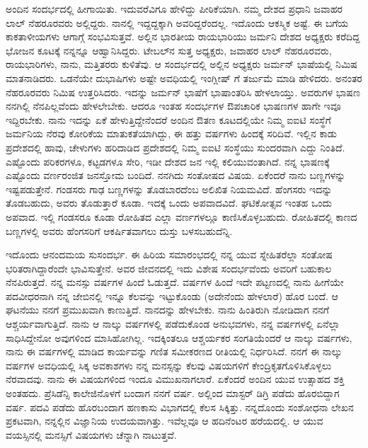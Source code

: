 \vskip 2pt

ಅಂದಿನ ಸಂದರ್ಭದಲ್ಲಿ ಹೀಗಾಯಿತು. ಇದುವರೆವಿಗೂ ಹೇಳಿದ್ದು ಪೀಠಿಕೆಯಾಗಿ. ನಮ್ಮ ದೇಶದ ಪ್ರಧಾನಿ ಜವಾಹರ ಲಾಲ್ ನೆಹರೂರವರು ಅಲ್ಲಿದ್ದರು. ನಾನಲ್ಲಿ ಇದ್ದದ್ದಕ್ಕಾಗಿ ಅವರಿದ್ದರೆಂದಲ್ಲ. ಇದೊಂದು ಆಕಸ್ಮಿಕ ಅಷ್ಟೆ. ಈ ಬಗೆಯ ಕಾಕತಾಳೀಯಗಳು ಆಗಾಗ್ಗೆ ಸಂಭವಿಸುತ್ತವೆ. ಅಲ್ಲಿನ ಭಾರತೀಯ ರಾಯಭಾರಿಯು ಜರ್ಮನಿ ದೇಶದ ಅಧ್ಯಕ್ಷರು ಕರೆದಿದ್ದ ಭೋಜನ ಕೂಟಕ್ಕೆ ನನ್ನನ್ನೂ ಆಹ್ವಾನಿಸಿದ್ದರು. ಟೇಬಲ್‍ನ ಸುತ್ತ ಅಧ್ಯಕ್ಷರು, ಜವಾಹರ ಲಾಲ್ ನೆಹರೂರವರು, ರಾಯಭಾರಿಗಳು, ನಾನು, ಮತ್ತಿತರರು ಕುಳಿತೆವು. ಆ ಸಂದರ್ಭದಲ್ಲಿ ಅಲ್ಲಿನ ಅಧ್ಯಕ್ಷರು ಜರ್ಮನ್ ಭಾಷೆಯಲ್ಲಿ  ನಿಮಿಷ ಮಾತನಾಡಿದರು. ಒಡನೆಯೇ ದುಭಾಷಿಗಳು ಅಷ್ಟೇ ಅವಧಿಯಲ್ಲಿ ಇಂಗ್ಲೀಷ್ ಗೆ ತರ್ಜುಮೆ ಮಾಡಿ ಹೇಳಿದರು. ಅನಂತರ ನೆಹರೂರವರು  ನಿಮಿಷ ಉತ್ತರಿಸಿದರು. ಇದನ್ನು ಜರ್ಮನ್ ಭಾಷೆಗೆ ಭಾಷಾಂತರಿಸಿ ಹೇಳಲಾಯ್ತು. ಅವರುಗಳ ಭಾಷಣ ನನಗಿಲ್ಲಿ ನೆನಪಿಲ್ಲವೆಂದು ಹೇಳಲೇಬೇಕು. ಆದರೂ ಇಂತಹ ಸಂದರ್ಭಗಳ ಔಪಚಾರಿಕ ಭಾಷಣಗಳ ಹಾಗೇ ಇವೂ ಇದ್ದಿರಬೇಕು. ನಾನು ಇದನ್ನು ಏಕೆ ಹೇಳುತ್ತಿದ್ದೇನೆಂದರೆ ಅಂದಿನ ಔತಣ ಕೂಟದಲ್ಲಿಯೇ ನಿಮ್ಮ ಐಐಟಿ ಸಂಸ್ಥೆಗೆ ಜರ್ಮನಿಯ ನೆರವು ಕೋರಿಕೆಯ ಮಾತುಕತೆಯಾಗಿದ್ದು, ಈ ಹತ್ತು ವರ್ಷಗಳು ಹಿಂದಕ್ಕೆ ಸರಿದಿವೆ. ಇಲ್ಲಿನ ಕಾಡು ಪ್ರದೇಶದಲ್ಲಿ ಹಾವು, ಚೇಳುಗಳು ಹರಿದಾಡಿದ ಪ್ರದೇಶದಲ್ಲಿ ನಿಮ್ಮ ಐಐಟಿ ಸಂಸ್ಥೆಯು ಸುಂದರವಾಗಿ ಎದ್ದು ನಿಂತಿದೆ. ಎಷ್ಟೊಂದು ಪರಿಕರಗಳೂ, ಕಟ್ಟಡಗಳೂ ಸೇರಿ, ಇಡೀ ದೇಶದ ಜನ ಇಲ್ಲಿ ಕಲಿಯುವಂತಾಗಿದೆ. ನನ್ನ ಭಾಷಣಕ್ಕೆ ಎಷ್ಟೊಂದು ವರ್ಣರಂಜಿತ ಜನಸ್ತೋಮ ಬಂದಿದೆ. ನನಗಿದು ಸಂತೋಷದ ವಿಷಯ. ಏಕೆಂದರೆ ನಾನು ಬಣ್ಣಗಳನ್ನು ಇಷ್ಟಪಡುತ್ತೇನೆ. ಗಂಡಸರು ಗಾಢ ಬಣ್ಣಗಳನ್ನು ತೊಡಬಾರದೆಂಬ ಅಲಿಖಿತ ನಿಯಮವಿದೆ. ಹೆಂಗಸರು ಇದನ್ನು ತೊಡಬಹುದು, ಅವರು ತೊಡುತ್ತಾರೆ ಕೂಡಾ. ಇದಕ್ಕೆ ಒಂದು ಅಪವಾದವಿದೆ. ಘಟಿಕೋತ್ಸವ ಇಂತಹ ಒಂದು ಅಪವಾದ. ಇಲ್ಲಿ ಗಂಡಸರೂ ಕೂಡಾ ರೋಹಿತದ ಎಲ್ಲಾ ವರ್ಣಗಳಲ್ಲೂ ಕಾಣಿಸಿಕೊಳ್ಳಬಹುದು. ರೋಹಿತದಲ್ಲಿ ಕಾಣದ ಬಣ್ಣಗಳಲ್ಲಿ ಅವರು ಹೆಂಗಸರಿಗೆ ಆಕರ್ಷಿತವಾಗಲು ದುಸ್ತು ಬಳಸಬಹುದೆನ್ನಿ.



ಇದೊಂದು ಆನಂದಮಯ ಸುಸಂದರ್ಭ. ಈ ಹಿರಿಯ ಸಮಾರಂಭದಲ್ಲಿ ನನ್ನ ಯುವ ಸ್ನೇಹಿತರೆಲ್ಲಾ ಸಂತೋಷ ಭರಿತರಾಗಿದ್ದಾರೆಂದೇ ಭಾವಿಸುತ್ತೇನೆ. ಅವರ ಜೀವನದಲ್ಲಿ ಇದು ವಿಶೇಷ ಸಂದರ್ಭವೆಂದು ಅವರಿಗೆ ಬಹುಕಾಲ ನೆನಪಿರುತ್ತದೆ. ನನ್ನ ಮನಸ್ಸು  ವರ್ಷಗಳ ಹಿಂದೆ ಓಡುತ್ತದೆ.  ವರ್ಷಗಳ ಹಿಂದೆ ಇದೇ ಪಟ್ಟಣದಲ್ಲಿ ನಾನು ಹೀಗೆಯೇ ಪದವೀಧರನಾಗಿ ನನ್ನ ಜೇಬಿನಲ್ಲಿ ಇನ್ನೂ ಕೆಲವನ್ನು ಇಟ್ಟುಕೊಂಡು (ಅದೇನೆಂದು ಹೇಳಲಾರೆ) ಹೊರ ಬಂದೆ. ಆ ಘಟನೆಯು ನನಗೆ ಪ್ರಮುಖವಾಗಿ ಕಾಣುತ್ತಿದೆ. ನಾನದನ್ನು ಹೇಳಬೇಕು. ನಾನು ಹಿಂತಿರುಗಿ ನೋಡಿದಾಗ ನನಗೆ ಆಶ್ಚರ್ಯವಾಗುತ್ತಿದೆ. ನಾನು ಆ ನಾಲ್ಕು ವರ್ಷಗಳಲ್ಲಿ ಪಡೆದುಕೊಂಡ ಅನುಭವಗಳು, ನನ್ನ  ವರ್ಷಗಳಲ್ಲಿ ಏನೆಲ್ಲಾ ಸಾಧಿಸಿದ್ದೇನೋ ಅವುಗಳಿಂದ ಮಾಸಿಹೋಗಿಲ್ಲ. ಇದಕ್ಕಿಂತಲೂ ಆಶ್ಚರ್ಯಕರ ಸಂಗತಿಯೆಂದರೆ ಆ ನಾಲ್ಕು ವರ್ಷಗಳು, ನಾನು ಈ  ವರ್ಷಗಳಲ್ಲಿ ಮಾಡಿದ ಕಾರ್ಯವನ್ನು ಗಣಿತ ಸಮೀಕರಣದ ರೀತಿಯಲ್ಲಿ ನಿರ್ಧರಿಸಿದೆ. ನನಗೆ ಈ ನಾಲ್ಕು ವರ್ಷಗಳ ಅವಧಿಯಲ್ಲಿ ಸಿಕ್ಕ ಅವಕಾಶಗಳು ನನ್ನ ಮನಸ್ಸನ್ನು ಕೆಲವು ವಿಷಯಗಳಿಗೆ ಕೇಂದ್ರಿಕೃತಗೊಳಿಸಿಕೊಳ್ಳಲು ನೆರವಾದವು. ನಾನು ಈ ವಿಷಯಗಳಿಂದ ಇಂದೂ ವಿಮುಖನಾಗಲಾರೆ. ಏಕೆಂದರೆ ಅಂದಿನ ಯುವ ಉತ್ಸಾಹದ ಶಕ್ತಿ ಅಂತಹದು. ಪ್ರೆಸಿಡೆನ್ಸಿ ಕಾಲೇಜಿನೊಳಗೆ ಬಂದಾಗ ನನಗೆ  ವರ್ಷ. ಅಲ್ಲಿಂದ ಮಾಸ್ಟರ್ ಡಿಗ್ರಿ ಪಡೆದು ಹೊರಬಿದ್ದಾಗ  ವರ್ಷ. ಪದವಿ ಪಡೆದು ಹೊರಬಂದಾಗ ಹಣಕಾಸು ವಿಭಾಗದಲ್ಲಿ ಕೆಲಸ ಸಿಕ್ಕಿತ್ತು. ನನ್ನದೊಂದು ಸಂಶೋಧನಾ ಲೇಖನ ಪ್ರಕಟವಾಗಿ, ನನ್ನಲ್ಲಿನ ವಿಜ್ಞಾನಿಯ ಉದಯವಾಗಿತ್ತು. ಇವೆಲ್ಲವೂ ಆ ಹದಿನೆಂಟರ ಹರೆಯದಲ್ಲಿ. ಆ ಯುವ ವಯಸ್ಸಿನಲ್ಲಿ ಮನಸ್ಸಿಗೆ ವಿಷಯಗಳು ಚೆನ್ನಾಗಿ ನಾಟುತ್ತವೆ.


